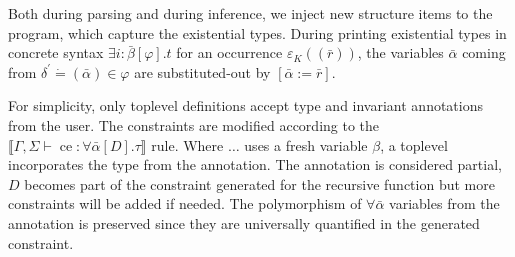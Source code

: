 \documentclass{article}
\newcommand{\assign}{:=}
\newcommand{\tmop}[1]{\ensuremath{\operatorname{#1}}}
\newcommand{\tmverbatim}[1]{{\ttfamily{#1}}}
\begin{document}
Both during parsing and during inference, we inject new structure items to the
program, which capture the existential types. During printing existential
types in concrete syntax $\exists i : \bar{\beta} [\varphi] .t$ for an
occurrence $\varepsilon_K ((\bar{r}))$, the variables $\bar{\alpha}$ coming
from $\delta^{\prime} \dot{=} (\bar{\alpha}) \in \varphi$ are substituted-out
by $[\bar{\alpha} \assign \bar{r}]$.

For simplicity, only toplevel definitions accept type and invariant
annotations from the user. The constraints are modified according to the
$\llbracket \Gamma, \Sigma \vdash \tmop{ce} : \forall \bar{\alpha} [D] . \tau
\rrbracket$ rule. Where \tmverbatim{let rec}$\ldots$\tmverbatim{in} uses a
fresh variable $\beta$, a toplevel \tmverbatim{let rec} incorporates the type
from the annotation. The annotation is considered partial, $D$ becomes part of
the constraint generated for the recursive function but more constraints will
be added if needed. The polymorphism of $\forall \bar{\alpha}$ variables from
the annotation is preserved since they are universally quantified in the
generated constraint.
\end{document}
